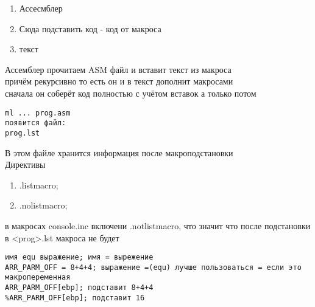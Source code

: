 \documentclass[a4paper, 12pt]{article}
\begin{document}
    \begin{enumerate}
        \item Ассесмблер
        \item Сюда подставить код - код от макроса
        \item текст
    \end{enumerate}
    Ассемблер прочитаем ASM файл и вставит текст из макроса\\
    причём рекурсивно то есть он и в текст дополнит макросами \\
    сначала он соберёт код полностью с учётом вставок а только потом 
\begin{lstlisting}
ml ... prog.asm
появится файл:
prog.lst
\end{lstlisting}
В этом файле хранится информация после макроподстановки \\
Директивы \\
\begin{enumerate}
    \item .listmacro;
    \item .nolistmacro;
\end{enumerate}
в макросах console.inc включени .notlistmacro, что значит что после подстановки в <prog>.lst макроса не будет
\begin{lstlisting}
имя equ выражение; имя = вырежение
ARR_PARM_OFF = 8+4+4; выражение =(equ) лучше пользоваться = если это макропеременная
ARR_PARM_OFF[ebp]; подставит 8+4+4
%ARR_PARM_OFF[ebp]; подставит 16
\end{lstlisting}
\end{document}
